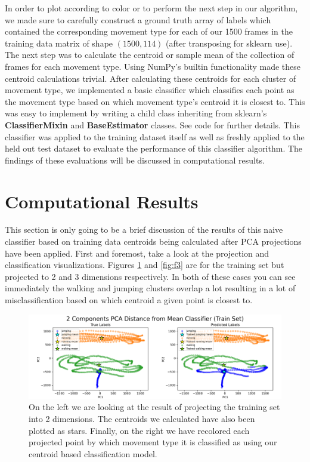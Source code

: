 \documentclass[11pt]{amsart}
\begin{document}
In order to plot according to color or to perform the next step in our algorithm, we made sure to carefully construct a ground truth array of labels which contained the corresponding movement type for each of our 1500 frames in the training data matrix of shape $(1500, 114)$ (after transposing for sklearn use).
The next step was to calculate the centroid or sample mean of the collection of frames for each movement type.
Using NumPy's builtin functionality made these centroid calculations trivial.
After calculating these centroids for each cluster of movement type, we implemented a basic classifier which classifies each point as the movement type based on which movement type's centroid it is closest to.
This was easy to implement by writing a child class inheriting from sklearn's \textbf{ClassifierMixin} and \textbf{BaseEstimator} classes.
See code for further details.
This classifier was applied to the training dataset itself as well as freshly applied to the held out test dataset to evaluate the performance of this classifier algorithm.
The findings of these evaluations will be discussed in computational results.

\section{Computational Results}\label{sec:results}
This section is only going to be a brief discussion of the results of this naive classifier based on training data centroids being calculated after PCA projections have been applied.
First and foremost, take a look at the projection and classification visualizations. Figures \ref{fig:f2} and \ref{fig:f3} are for the training set but projected to 2 and 3 dimensions respectively.
In both of these cases you can see immediately the walking and jumping clusters overlap a lot resulting in a lot of misclassification based on which centroid a given point is closest to.

\begin{figure}[h]
	\centering
	\includegraphics[width=.75\textwidth]{../visualizations/pca_distance_from_mean_classifier_2d.png}
 	\caption{On the left we are looking at the result of projecting the training set into 2 dimensions.
	The centroids we calculated have also been plotted as stars.
	Finally, on the right we have recolored each projected point by which movement type it is classified as using our centroid based classification model.}\label{fig:f2}
\end{figure}
\end{document}
